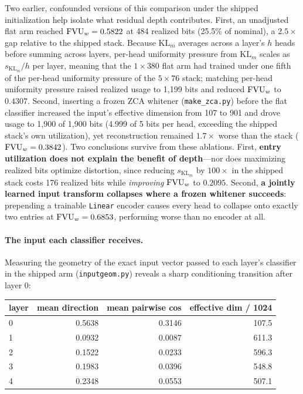 Two earlier, confounded versions of this comparison under the shipped
initialization help isolate what residual depth contributes. First, an
unadjusted flat arm reached $\mathrm{FVU}_w = 0.5822$ at 484 realized bits (25.5\%
of nominal), a $2.5\times$ gap relative to the shipped stack. Because
$\mathrm{KL}_m$ averages across a layer's $h$ heads before summing across
layers, per-head uniformity pressure from $\mathrm{KL}_m$ scales as
$s_{\mathrm{KL}_m}/h$ per layer, meaning that the $1\times380$ flat arm
had trained under one fifth of the per-head uniformity pressure of the
$5\times76$ stack; matching per-head uniformity pressure raised realized
usage to 1{,}199 bits and reduced $\mathrm{FVU}_w$ to $0.4307$. Second, inserting a
frozen ZCA whitener (\texttt{make\_zca.py}) before the flat classifier
increased the input's effective dimension from 107 to 901 and drove usage
to 1{,}900 of 1{,}900 bits (4.999 of 5 bits per head, exceeding the
shipped stack's own utilization), yet reconstruction remained $1.7\times$
worse than the stack ($\mathrm{FVU}_w = 0.3842$). Two conclusions survive from
these ablations. First, \textbf{entry utilization does not explain the
benefit of depth}---nor does maximizing realized bits optimize
distortion, since reducing $s_{\mathrm{KL}_m}$ by $100\times$ in the
shipped stack costs 176 realized bits while \emph{improving} $\mathrm{FVU}_w$ to
$0.2095$. Second, \textbf{a jointly learned input transform collapses
where a frozen whitener succeeds}: prepending a trainable \texttt{Linear}
encoder causes every head to collapse onto exactly two entries at $\mathrm{FVU}_w =
0.6853$, performing worse than no encoder at all.

\paragraph{The input each classifier receives.} Measuring the geometry of
the exact input vector passed to each layer's classifier in the shipped
arm (\texttt{inputgeom.py}) reveals a sharp conditioning transition after
layer 0:

\begin{center}\small
\begin{tabular}{@{}lrrr@{}}
\toprule
layer & mean direction & mean pairwise cos & effective dim / 1024 \\
\midrule
0 & 0.5638 & 0.3146 & 107.5 \\
1 & 0.0932 & 0.0087 & 611.3 \\
2 & 0.1522 & 0.0233 & 596.3 \\
3 & 0.1983 & 0.0396 & 548.8 \\
4 & 0.2348 & 0.0553 & 507.1 \\
\bottomrule
\end{tabular}
\end{center}

